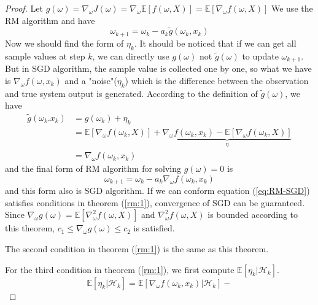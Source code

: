   \begin{proof}
    Let $g(\omega)=\nabla_{\omega}J(\omega)=\nabla_{\omega}\mathbb{E}[f(\omega,X)]=\mathbb{E}[\nabla_{\omega}f(\omega,X)]$
    We use the RM algorithm and have
    \begin{equation*}
      \omega_{k+1} = \omega_{k} - a_{k}\tilde{g}(\omega_{k},x_{k})
    \end{equation*}
    Now we should find the form of $\eta_{k}$. It should be noticed that if we can get all sample values at step $k$, we
    can directly use $g(\omega)$ not $\tilde{g}(\omega)$ to update $\omega_{k+1}$. But in SGD algorithm, the sample value
    is collected one by one, so what we have is $\nabla_{\omega}f(\omega,x_{k})$ and a "noise"($\eta_{k}$) which is the
    difference between the observation and true system output is generated. According to the definition of
    $\tilde{g}(\omega)$, we have
    \begin{align*}
      \tilde{g}(\omega_{k}.x_{k}) & = g(\omega_{k}) + \eta_{k}                                                                                                                         \\
                                  & = \mathbb{E}[\nabla_{\omega}f(\omega_{k},X)] + \underbrace{\nabla_{\omega}f(\omega_{k},x_{k}) - \mathbb{E}[\nabla_{\omega}f(\omega_{k},X)]}_{\eta} \\
                                  & = \nabla_{\omega}f(\omega_{k},x_{k})
    \end{align*}
    and the final form of RM algorithm for solving $g(\omega)=0$ is
    \begin{equation}
      \label{eq:RM-SGD}
      \omega_{k+1} = \omega_{k} - a_{k}\nabla_{\omega}f(\omega_{k},x_{k})
    \end{equation}
    and this form also is SGD algorithm. If we can conform equation (\ref{eq:RM-SGD}) satisfies conditions in theorem
    (\ref{rm:1}), convergence of SGD can be guaranteed. Since
    $\nabla_{\omega}g(\omega)=\mathbb{E}[\nabla_{\omega}^{2}f(\omega,X)]$ and $\nabla_{\omega}^{2}f(\omega,X)$ is bounded
    according to this theorem, $c_{1} \le \nabla_{\omega}g(\omega) \le c_{2}$ is satisfied. \par The second condition in
    theorem (\ref{rm:1}) is the same as this theorem. \par For the third condition in theorem (\ref{rm:1}), we first
    compute $\mathbb{E}[\eta_{k}|\mathcal{H}_{k}]$.
    \begin{equation*}
      \mathbb{E}[\eta_{k}|\mathcal{H}_{k}] = \mathbb{E}[\nabla_{\omega}f(\omega_{k}, x_{k})|\mathcal{H}_{k}] -

\end{equation*}
\end{proof}
